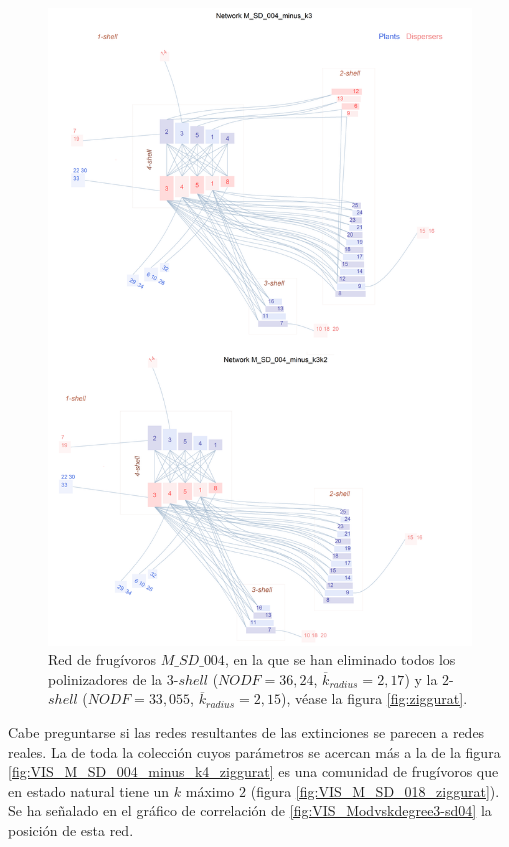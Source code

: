 \clearpage
\begin{figure}[ht!]
\centering
\includegraphics[scale=0.5]{Figures/VIS_M_SD_004_minus_k3k2_ziggurat.png}
\caption {Red de frugívoros $M\_SD\_004$, en la que se han eliminado todos los polinizadores de la $3$-$shell$ ($NODF = 36,24$, $\overline k_{radius} = 2,17$) y la $2$-$shell$ ($NODF = 33,055$, $\overline k_{radius} = 2,15$), véase la figura \ref{fig:ziggurat}.} 
\label{fig:VIS_M_SD_004_minus_k3k2_ziggurat}
\end{figure}

\clearpage
Cabe preguntarse si las redes resultantes de las extinciones se parecen a redes reales. La de toda la colección cuyos parámetros se acercan más a la de la figura \ref{fig:VIS_M_SD_004_minus_k4_ziggurat} es una comunidad de frugívoros que en estado natural tiene un $k$ máximo $2$ (figura \ref{fig:VIS_M_SD_018_ziggurat}). Se ha señalado en el gráfico de correlación de \ref{fig:VIS_Modvskdegree3-sd04} la posición de esta red.

